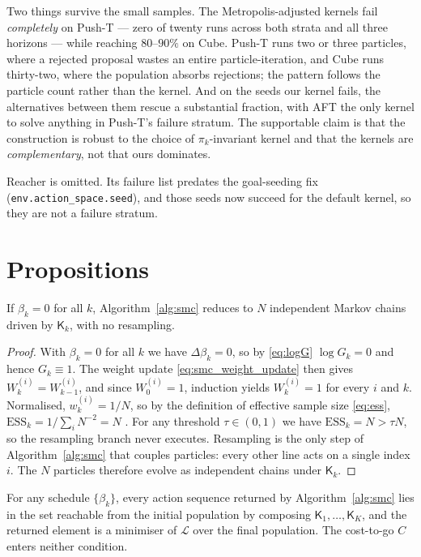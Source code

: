 Two things survive the small samples. The Metropolis-adjusted kernels fail
\emph{completely} on Push-T --- zero of twenty runs across both strata and all
three horizons --- while reaching $80$--$90\%$ on Cube. Push-T runs two or three
particles, where a rejected proposal wastes an entire particle-iteration, and
Cube runs thirty-two, where the population absorbs rejections; the pattern
follows the particle count rather than the kernel. And on the seeds our kernel
fails, the alternatives between them rescue a substantial fraction, with AFT the
only kernel to solve anything in Push-T's failure stratum. The supportable claim
is that the construction is robust to the choice of $\pi_k$-invariant kernel and
that the kernels are \emph{complementary}, not that ours dominates.

Reacher is omitted. Its failure list predates the goal-seeding fix
(\texttt{env.action\_space.seed}), and those seeds now succeed for the default
kernel, so they are not a failure stratum.

\section{Propositions}
\label{app:proofs}

\begin{proposition}
\label{prop:beta0}
If $\beta_k=0$ for all $k$, Algorithm~\ref{alg:smc} reduces to $N$ independent
Markov chains driven by $\mathsf{K}_k$, with no resampling.
\end{proposition}

\begin{proof}
With $\beta_k=0$ for all $k$ we have $\Delta\beta_k=0$, so by \eqref{eq:logG}
$\log G_k=0$ and hence $G_k\equiv 1$. The weight update
\eqref{eq:smc_weight_update} then gives $W_k^{(i)}=W_{k-1}^{(i)}$, and since
$W_0^{(i)}=1$, induction yields $W_k^{(i)}=1$ for every $i$ and $k$. Normalised,
$w_k^{(i)}=1/N$, so by the definition of effective sample size
\eqref{eq:ess}, $\mathrm{ESS}_k=1/\sum_i N^{-2}=N$
. For any threshold $\tau\in(0,1)$ we have
$\mathrm{ESS}_k=N>\tau N$, so the resampling branch never executes. Resampling
is the only step of Algorithm~\ref{alg:smc} that couples particles: every other
line acts on a single index $i$. The $N$ particles therefore evolve as
independent chains under $\mathsf{K}_k$.
\end{proof}

\begin{proposition}
\label{prop:selection}
For any schedule $\{\beta_k\}$, every action sequence returned by
Algorithm~\ref{alg:smc} lies in the set reachable from the initial population by
composing $\mathsf{K}_1,\ldots,\mathsf{K}_K$, and the returned element is a
minimiser of $\mathcal{L}$ over the final population. The cost-to-go $C$ enters
neither condition.
\end{proposition}

